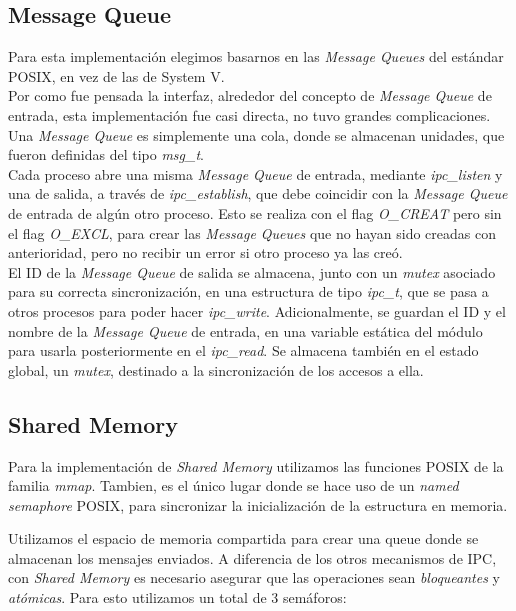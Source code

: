 \documentclass[a4paper,10pt]{article}
\begin{document}
\subsection{Message Queue}

Para esta implementación elegimos basarnos en las \textit{Message Queues} del estándar POSIX, en vez de las de System V.\\

Por como fue pensada la interfaz, alrededor del concepto de \textit{Message Queue} de entrada, esta implementación fue casi directa, no tuvo grandes complicaciones.
Una \textit{Message Queue} es simplemente una cola, donde se almacenan unidades, que fueron definidas del tipo \textit{msg\_t}.\\

Cada proceso abre una misma \textit{Message Queue} de entrada, mediante \textit{ipc\_listen} y una de salida, a través de \textit{ipc\_establish}, que debe coincidir 
con la \textit{Message Queue} de entrada de algún otro proceso. Esto se realiza con el flag \textit{O\_CREAT} pero sin el flag \textit{O\_EXCL}, para crear las 
\textit{Message Queues} que no hayan sido creadas con anterioridad, pero no recibir un error si otro proceso ya las creó.\\

El ID de la \textit{Message Queue} de salida se almacena, junto con un \textit{mutex} asociado para su correcta sincronización, en una estructura de tipo 
\textit{ipc\_t}, que se pasa a otros procesos para poder hacer \textit{ipc\_write}. Adicionalmente, se guardan el ID y el nombre de la \textit{Message Queue} 
de entrada, en una variable estática del módulo para usarla posteriormente en el \textit{ipc\_read}. Se almacena también en el estado global, 
un \textit{mutex}, destinado a la sincronización de los accesos a ella.\\

\subsection{Shared Memory}
Para la implementación de \textit{Shared Memory} utilizamos las funciones POSIX de la familia \textit{mmap}.
Tambien, es el único lugar donde se hace uso de un \textit{named semaphore} POSIX, para sincronizar la inicialización de la estructura en memoria.

Utilizamos el espacio de memoria compartida para crear una queue donde se almacenan los mensajes enviados.
A diferencia de los otros mecanismos de IPC, con \textit{Shared Memory} es necesario asegurar que las operaciones sean \textit{bloqueantes} y \textit{atómicas}.
Para esto utilizamos un total de 3 semáforos:
\end{document}
